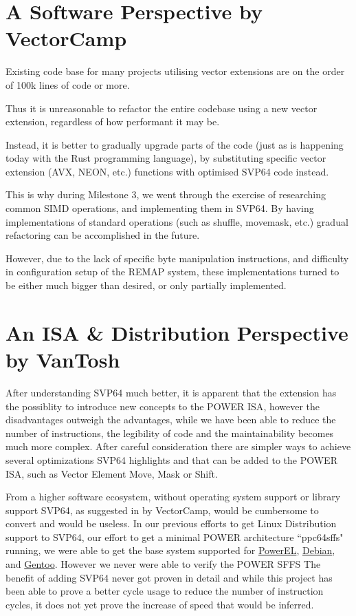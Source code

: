 \section{A Software Perspective by VectorCamp}
\label{sec:vecotorscansoftwareperspective}

Existing code base for many projects utilising vector extensions are on the
order of 100k lines of code or more.

Thus it is unreasonable to refactor the entire codebase using a new vector
extension, regardless of how performant it may be.

Instead, it is better to gradually upgrade parts of the code (just as is
happening today with the Rust programming language), by substituting specific
vector extension (\acrshort{AVX}, NEON, etc.) functions with optimised \acrshort{SVP64} code instead.

This is why during Milestone 3, we went through the exercise of researching
common \acrshort{SIMD} operations, and implementing them in \acrshort{SVP64}. By having
implementations of standard operations (such as shuffle, movemask, etc.)
gradual refactoring can be accomplished in the future.

However, due to the lack of specific byte manipulation instructions, and
difficulty in configuration setup of the REMAP system, these implementations
turned to be either much bigger than desired, or only partially implemented.


\section{An ISA \& Distribution Perspective by VanTosh}

After understanding \acrshort{SVP64} much better, it is apparent that the extension has
the possiblity to introduce new concepts to the \acrshort{POWER} \acrshort{ISA},
however the disadvantages outweigh the advantages, while we have been able to
reduce the number of instructions, the legibility of code and the maintainability
becomes much more complex.
After careful consideration there are simpler ways to achieve several optimizations
\acrshort{SVP64} highlights and that can be added to the \acrshort{POWER} \acrshort{ISA},
such as Vector Element Move, Mask or Shift.

From a higher software ecosystem, without operating system support or library support
\acrshort{SVP64}, as suggested in \label{sec:vecotorscansoftwareperspective} by VectorCamp,
would be cumbersome to convert and would be useless.
In our previous efforts to get Linux Distribution support to \acrshort{SVP64}, our effort to
get a minimal \acrshort{POWER} architecture ``ppc64sffs" running, we were able
to get the base system supported for \href{https://www.powerel.org}{PowerEL},
\href{https://www.debian.org}{Debian}, and \href{https://gentoo.org}{Gentoo}.
However we never were able to verify the \acrshort{POWER} \acrfull{SFFS}
The benefit of adding \acrshort{SVP64} never got proven in detail and while this project
has been able to prove a better cycle usage to reduce the number of instruction
cycles, it does not yet prove the increase of speed that would be inferred.

